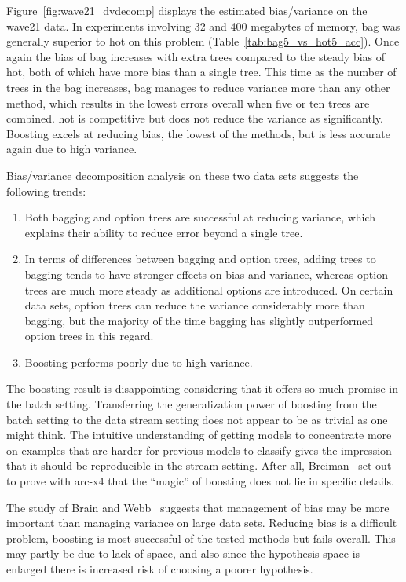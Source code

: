 Figure~\ref{fig:wave21_dvdecomp} displays the estimated bias/variance on the {\sc wave21} data. In experiments involving 32 and 400 megabytes of memory, {\sc bag} was generally superior to {\sc hot} on this problem (Table~\ref{tab:bag5_vs_hot5_acc}). Once again the bias of {\sc bag} increases with extra trees compared to the steady bias of {\sc hot}, both of which have more bias than a single tree. This time as the number of trees in the bag increases, {\sc bag} manages to reduce variance more than any other method, which results in the lowest errors overall when five or ten trees are combined. {\sc hot} is competitive but does not reduce the variance as significantly. Boosting excels at reducing bias, the lowest of the methods, but is less accurate again due to high variance.

Bias/variance decomposition analysis on these two data sets suggests the following trends: 

\begin{enumerate}
\item Both bagging and option trees are successful at reducing variance, which explains their ability to reduce error beyond a single tree. 
\item In terms of differences between bagging and option trees, adding trees to bagging tends to have stronger effects on bias and variance, whereas option trees are much more steady as additional options are introduced. On certain data sets, option trees can reduce the variance considerably more than bagging, but the majority of the time bagging has slightly outperformed option trees in this regard.
\item Boosting performs poorly due to high variance.
\end{enumerate}

The boosting result is disappointing considering that it offers so much promise in the batch setting. Transferring the generalization power of boosting from the batch setting to the data stream setting does not appear to be as trivial as one might think. The intuitive understanding of getting models to concentrate more on examples that are harder for previous models to classify gives the impression that it should be reproducible in the stream setting. After all, Breiman~\cite{arcing} set out to prove with arc-x4 that the ``magic'' of boosting does not lie in specific details.

The study of Brain and Webb~\cite{lowbiaslargeds} suggests that management of bias may be more important than managing variance on large data sets. Reducing bias is a difficult problem, boosting is most successful of
the tested methods but fails overall. This may partly be due to lack of space, and also since the hypothesis space is enlarged there is increased risk of choosing a poorer hypothesis.

